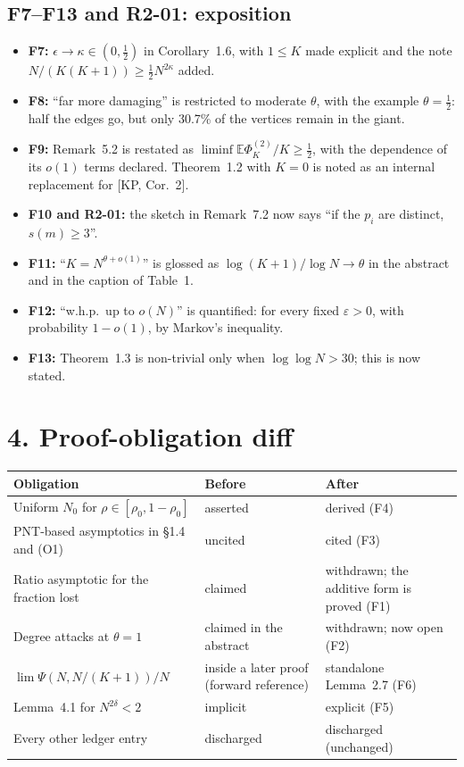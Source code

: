 \documentclass[10pt]{article}
\newcommand{\E}{\mathbb{E}}
\begin{document}
\subsection*{F7--F13 and R2-01: exposition}
\begin{after}
\begin{itemize}\itemsep1pt
\item \textbf{F7:} $\epsilon\to\kappa\in(0,\frac12)$ in Corollary~1.6, with $1\le K$ made explicit and the note $N/(K(K+1))\ge\frac12N^{2\kappa}$ added.
\item \textbf{F8:} ``far more damaging'' is restricted to moderate $\theta$, with the example $\theta=\frac12$: half the edges go, but only 30.7\% of the vertices remain in the giant.
\item \textbf{F9:} Remark~5.2 is restated as $\liminf\E\Phi^{(2)}_K/K\ge\frac12$, with the dependence of its $o(1)$ terms declared. Theorem~1.2 with $K=0$ is noted as an internal replacement for [KP, Cor.~2].
\item \textbf{F10 and R2-01:} the sketch in Remark~7.2 now says ``if the $p_i$ are distinct, $s(m)\ge3$''.
\item \textbf{F11:} ``$K=N^{\theta+o(1)}$'' is glossed as $\log(K+1)/\log N\to\theta$ in the abstract and in the caption of Table~1.
\item \textbf{F12:} ``w.h.p.\ up to $o(N)$'' is quantified: for every fixed $\varepsilon>0$, with probability $1-o(1)$, by Markov's inequality.
\item \textbf{F13:} Theorem~1.3 is non-trivial only when $\log\log N>30$; this is now stated.
\end{itemize}
\end{after}

\section*{4. Proof-obligation diff}

\begin{longtable}{@{}>{\raggedright\arraybackslash}p{}>{\raggedright\arraybackslash}p{}>{\raggedright\arraybackslash}p{}@{}}
\toprule
Obligation & Before & After\\
\midrule
\endhead
Uniform $N_0$ for $\rho\in[\rho_0,1-\rho_0]$ & asserted & derived (F4)\\
PNT-based asymptotics in \S1.4 and (O1) & uncited & cited (F3)\\
Ratio asymptotic for the fraction lost & claimed & withdrawn; the additive form is proved (F1)\\
Degree attacks at $\theta=1$ & claimed in the abstract & withdrawn; now open (F2)\\
$\lim\Psi(N,N/(K+1))/N$ & inside a later proof (forward reference) & standalone Lemma~2.7 (F6)\\
Lemma~4.1 for $N^{2\delta}<2$ & implicit & explicit (F5)\\
Every other ledger entry & discharged & discharged (unchanged)\\
\bottomrule
\end{longtable}
\end{document}
